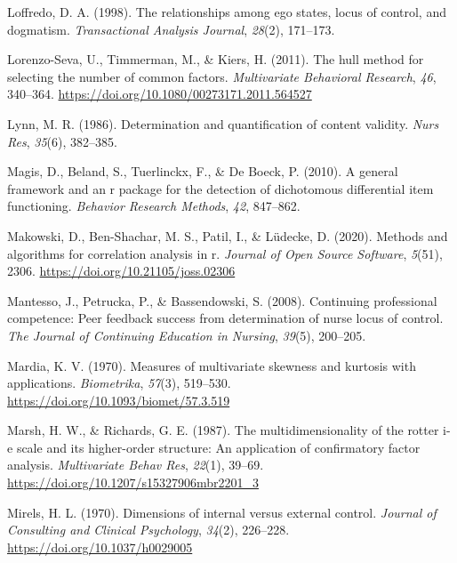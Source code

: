\documentclass[
  english,
  man]{apa6}
\newlength{\cslhangindent}
\newlength{\cslentryspacingunit} %
\newenvironment{CSLReferences}[2] %
 {%
  \setlength{\parindent}{0pt}
  \ifodd #1
  \let\oldpar\par
  \def\par{\hangindent=\cslhangindent\oldpar}
  \fi
  \setlength{\parskip}{#2\cslentryspacingunit}
 }%
 {}
\begin{document}
\begin{CSLReferences}{1}{0}
\leavevmode{}%
Loffredo, D. A. (1998). The relationships among ego states, locus of control, and dogmatism. \emph{Transactional Analysis Journal}, \emph{28}(2), 171--173.

\leavevmode{}%
Lorenzo-Seva, U., Timmerman, M., \& Kiers, H. (2011). The hull method for selecting the number of common factors. \emph{Multivariate Behavioral Research}, \emph{46}, 340--364. \url{https://doi.org/10.1080/00273171.2011.564527}

\leavevmode{}%
Lynn, M. R. (1986). Determination and quantification of content validity. \emph{Nurs Res}, \emph{35}(6), 382--385.

\leavevmode{}%
Magis, D., Beland, S., Tuerlinckx, F., \& De Boeck, P. (2010). A general framework and an r package for the detection of dichotomous differential item functioning. \emph{Behavior Research Methods}, \emph{42}, 847--862.

\leavevmode{}%
Makowski, D., Ben-Shachar, M. S., Patil, I., \& Lüdecke, D. (2020). Methods and algorithms for correlation analysis in r. \emph{Journal of Open Source Software}, \emph{5}(51), 2306. \url{https://doi.org/10.21105/joss.02306}

\leavevmode{}%
Mantesso, J., Petrucka, P., \& Bassendowski, S. (2008). Continuing professional competence: Peer feedback success from determination of nurse locus of control. \emph{The Journal of Continuing Education in Nursing}, \emph{39}(5), 200--205.

\leavevmode{}%
Mardia, K. V. (1970). Measures of multivariate skewness and kurtosis with applications. \emph{Biometrika}, \emph{57}(3), 519--530. \url{https://doi.org/10.1093/biomet/57.3.519}

\leavevmode{}%
Marsh, H. W., \& Richards, G. E. (1987). The multidimensionality of the rotter i-e scale and its higher-order structure: An application of confirmatory factor analysis. \emph{Multivariate Behav Res}, \emph{22}(1), 39--69. \url{https://doi.org/10.1207/s15327906mbr2201_3}

\leavevmode{}%
Mirels, H. L. (1970). Dimensions of internal versus external control. \emph{Journal of Consulting and Clinical Psychology}, \emph{34}(2), 226--228. \url{https://doi.org/10.1037/h0029005}


\end{CSLReferences}
\end{document}
